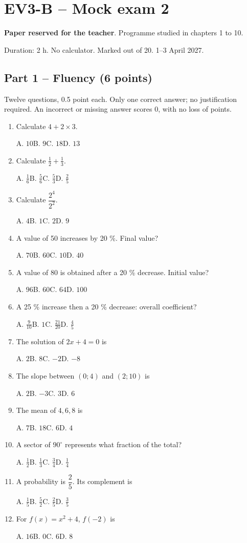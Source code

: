 \mxnewpage\section*{EV3-B -- Mock exam 2}\label{EV3-B}
\textbf{Paper reserved for the teacher}. Programme studied in chapters 1 to 10.\par Duration: 2 h. No calculator. Marked out of 20. 1--3 April 2027.
\subsection*{Part 1 -- Fluency (6 points)}
Twelve questions, 0.5 point each. Only one correct answer; no justification required. An incorrect or missing answer scores 0, with no loss of points.
\begin{enumerate}
\item Calculate $4+2\times3$.\par A. $10$\quad B. $9$\quad C. $18$\quad D. $13$
\item Calculate $\frac12+\frac13$.\par A. $\frac{1}{6}$\quad B. $\frac{5}{6}$\quad C. $\frac{5}{3}$\quad D. $\frac{2}{5}$
\item Calculate $\dfrac{2^4}{2^{2}}$.\par A. $4$\quad B. $1$\quad C. $2$\quad D. $9$
\item A value of 50 increases by 20 \%. Final value?\par A. $70$\quad B. $60$\quad C. $10$\quad D. $40$
\item A value of 80 is obtained after a 20 \% decrease. Initial value?\par A. $96$\quad B. $60$\quad C. $64$\quad D. $100$
\item A 25 \% increase then a 20 \% decrease: overall coefficient?\par A. $\frac{9}{10}$\quad B. $1$\quad C. $\frac{21}{20}$\quad D. $\frac{4}{5}$
\item The solution of $2x+4=0$ is\par A. $2$\quad B. $8$\quad C. $-2$\quad D. $-8$
\item The slope between $(0;4)$ and $(2;10)$ is\par A. $2$\quad B. $-3$\quad C. $3$\quad D. $6$
\item The mean of $4, 6, 8$ is\par A. $7$\quad B. $18$\quad C. $6$\quad D. $4$
\item A sector of $90^\circ$ represents what fraction of the total?\par A. $\frac{1}{2}$\quad B. $\frac{1}{3}$\quad C. $\frac{3}{4}$\quad D. $\frac{1}{4}$
\item A probability is $\dfrac{2}{5}$. Its complement is\par A. $\frac{1}{5}$\quad B. $\frac{5}{2}$\quad C. $\frac{2}{5}$\quad D. $\frac{3}{5}$
\item For $f(x)=x^2+4$, $f(-2)$ is\par A. $16$\quad B. $0$\quad C. $6$\quad D. $8$
\end{enumerate}
